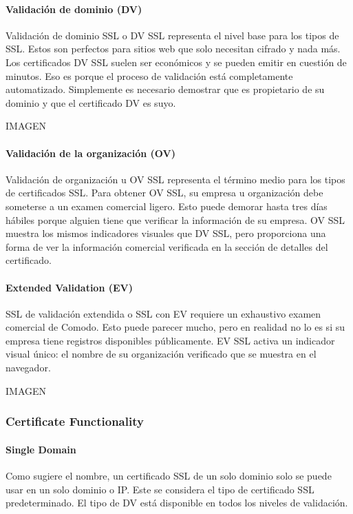 \paragraph*{Validación de dominio (DV)}
Validación de dominio SSL o DV SSL representa el nivel base para los tipos de SSL. 
Estos son perfectos para sitios web que solo necesitan cifrado y nada más. Los 
certificados DV SSL suelen ser económicos y se pueden emitir en cuestión de minutos. 
Eso es porque el proceso de validación está completamente automatizado. Simplemente 
es necesario demostrar que es propietario de su dominio y que el certificado DV 
es suyo. 

IMAGEN

\paragraph*{Validación de la organización (OV)}
Validación de organización u OV SSL representa el término medio para los tipos de 
certificados SSL. Para obtener OV SSL, su empresa u organización debe someterse a 
un examen comercial ligero. Esto puede demorar hasta tres días hábiles porque alguien 
tiene que verificar la información de su empresa. OV SSL muestra los mismos indicadores 
visuales que DV SSL, pero proporciona una forma de ver la 
información comercial verificada en la sección de detalles del certificado. 

\paragraph*{Extended Validation (EV)}
SSL de validación extendida o SSL con EV requiere un exhaustivo examen comercial de 
Comodo. Esto puede parecer mucho, pero en realidad no lo es si su empresa tiene 
registros disponibles públicamente. EV SSL activa un indicador visual único: el 
nombre de su organización verificado que se muestra en el navegador.

IMAGEN

  \subsubsection*{Certificate Functionality}

  \paragraph*{Single Domain}
  Como sugiere el nombre, un certificado SSL de un solo dominio solo 
  se puede usar en un solo dominio o IP. Este se considera el tipo de 
  certificado SSL predeterminado. El tipo de DV está disponible en todos 
  los niveles de validación.
  
